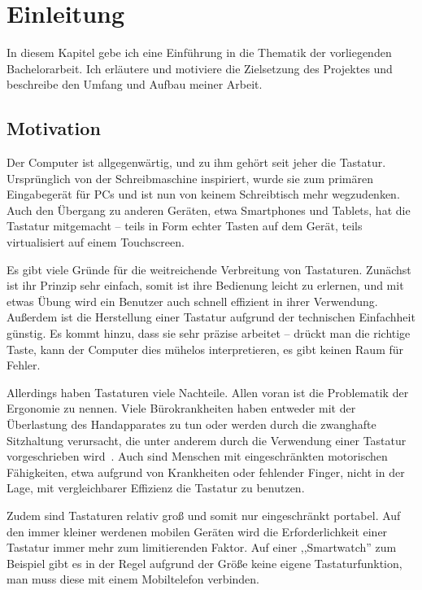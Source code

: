 \chapter{Einleitung}

In diesem Kapitel gebe ich eine Einführung in die Thematik der vorliegenden
Bachelorarbeit. Ich erläutere und motiviere die Zielsetzung des Projektes und
beschreibe den Umfang und Aufbau meiner Arbeit.

\section{Motivation}

Der Computer ist allgegenwärtig, und zu ihm gehört seit jeher die Tastatur.
Ursprünglich von der Schreibmaschine inspiriert, wurde sie zum primären
Eingabegerät für PCs und ist nun von keinem Schreibtisch mehr wegzudenken. Auch
den Übergang zu anderen Geräten, etwa Smartphones und Tablets, hat die Tastatur
mitgemacht -- teils in Form echter Tasten auf dem Gerät, teils virtualisiert
auf einem Touchscreen.

Es gibt viele Gründe für die weitreichende Verbreitung von Tastaturen. Zunächst
ist ihr Prinzip sehr einfach, somit ist ihre Bedienung leicht zu erlernen, und
mit etwas Übung wird ein Benutzer auch schnell effizient in ihrer Verwendung.
Außerdem ist die Herstellung einer Tastatur aufgrund der technischen
Einfachheit günstig. Es kommt hinzu, dass sie sehr präzise arbeitet -- drückt
man die richtige Taste, kann der Computer dies mühelos interpretieren, es gibt
keinen Raum für Fehler.

Allerdings haben Tastaturen viele Nachteile. Allen voran ist die Problematik
der Ergonomie zu nennen. Viele Bürokrankheiten haben entweder mit der
Überlastung des Hand\-ap\-pa\-ra\-tes zu tun oder werden durch die zwanghafte
Sitz\-hal\-tung verursacht, die unter anderem durch die Verwendung einer
Tastatur vorgeschrieben wird~\citep{disorders}. Auch sind Menschen mit
eingeschränkten motorischen Fähigkeiten, etwa aufgrund von Krankheiten oder
fehlender Finger, nicht in der Lage, mit vergleichbarer Effizienz die Tastatur
zu benutzen.

Zudem sind Tastaturen relativ groß und somit nur eingeschränkt portabel. Auf
den immer kleiner werdenen mobilen Geräten wird die Erforderlichkeit einer
Tastatur immer mehr zum limitierenden Faktor. Auf einer ,,Smartwatch'' zum
Beispiel gibt es in der Regel aufgrund der Größe keine eigene Tastaturfunktion,
man muss diese mit einem Mobiltelefon verbinden.

